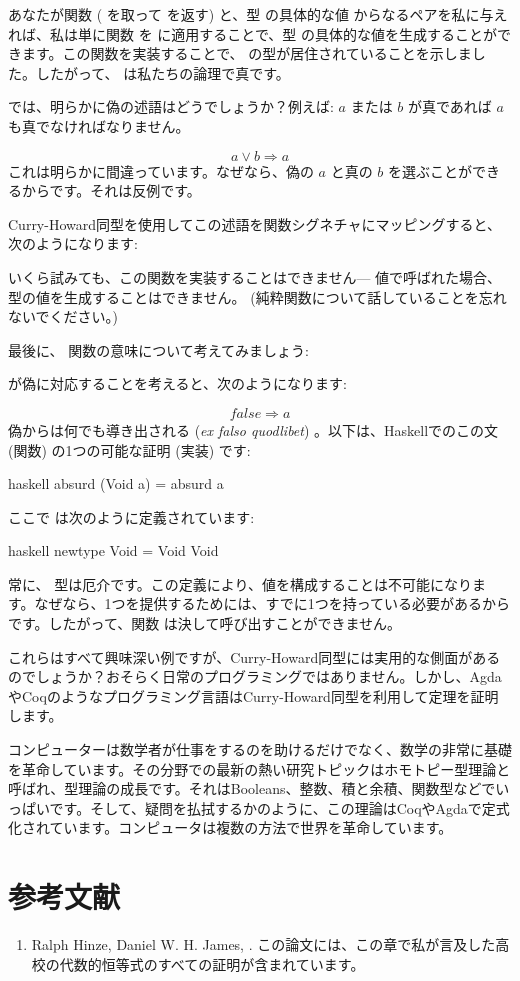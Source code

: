 あなたが関数  ( を取って  を返す) と、型  の具体的な値  からなるペアを私に与えれば、私は単に関数  を  に適用することで、型  の具体的な値を生成することができます。この関数を実装することで、 の型が居住されていることを示しました。したがって、 は私たちの論理で真です。

では、明らかに偽の述語はどうでしょうか？例えば: $a$ または $b$ が真であれば $a$ も真でなければなりません。

\[a \vee b \Rightarrow a\]
これは明らかに間違っています。なぜなら、偽の $a$ と真の $b$ を選ぶことができるからです。それは反例です。

Curry-Howard同型を使用してこの述語を関数シグネチャにマッピングすると、次のようになります: 

いくら試みても、この関数を実装することはできません--- 値で呼ばれた場合、 型の値を生成することはできません。 (純粋関数について話していることを忘れないでください。) 

最後に、 関数の意味について考えてみましょう: 

 が偽に対応することを考えると、次のようになります: 

\[\mathit{false} \Rightarrow a\]
偽からは何でも導き出される (\emph{ex falso quodlibet}) 。以下は、Haskellでのこの文 (関数) の1つの可能な証明 (実装) です: 

\begin{snip}{haskell}
absurd (Void a) = absurd a
\end{snip}
ここで  は次のように定義されています: 

\begin{snip}{haskell}
newtype Void = Void Void
\end{snip}
常に、 型は厄介です。この定義により、値を構成することは不可能になります。なぜなら、1つを提供するためには、すでに1つを持っている必要があるからです。したがって、関数  は決して呼び出すことができません。

これらはすべて興味深い例ですが、Curry-Howard同型には実用的な側面があるのでしょうか？おそらく日常のプログラミングではありません。しかし、AgdaやCoqのようなプログラミング言語はCurry-Howard同型を利用して定理を証明します。

コンピューターは数学者が仕事をするのを助けるだけでなく、数学の非常に基礎を革命しています。その分野での最新の熱い研究トピックはホモトピー型理論と呼ばれ、型理論の成長です。それはBooleans、整数、積と余積、関数型などでいっぱいです。そして、疑問を払拭するかのように、この理論はCoqやAgdaで定式化されています。コンピュータは複数の方法で世界を革命しています。

\section{参考文献}

\begin{enumerate}
  \tightlist
  \item
        Ralph Hinze, Daniel W. H. James,
        . この論文には、この章で私が言及した高校の代数的恒等式のすべての証明が含まれています。
\end{enumerate}
